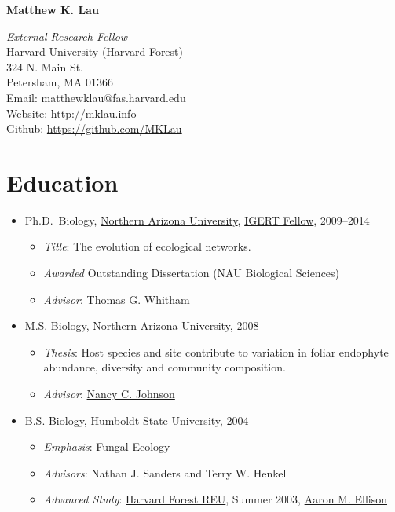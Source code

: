 \documentclass[a4paper]{article}
\author{}
\date{}
\begin{document}
\textbf{\Large Matthew K. Lau} \\

\hline

\begin{multicols}{2}
\textit{External Research Fellow} \\
Harvard University (Harvard Forest) \\
324 N. Main St. \\
Petersham, MA 01366 \\
Email: matthewklau@fas.harvard.edu \\
Website: \url{http://mklau.info} \\
Github: \url{https://github.com/MKLau} \\
\end{multicols}

\section{Education}\label{education}

\begin{itemize}
\item
  Ph.D.~Biology, \href{http://www.nau.edu}{Northern Arizona University},
  \href{http://www.mpcer.nau.edu/igert/}{IGERT Fellow}, 2009--2014

  \begin{itemize}
  \item
    \emph{Title}: The evolution of ecological networks.
  \item
    \emph{Awarded} Outstanding Dissertation (NAU Biological Sciences)
  \item
    \emph{Advisor}:
    \href{http://www6.nau.edu/biology/People/Faculty/Whitham/Whitham.htm}{Thomas
    G. Whitham}
  \end{itemize}
\item
  M.S. Biology, \href{http://www.nau.edu}{Northern Arizona University},
  2008
  \begin{itemize}
  \item
    \emph{Thesis}: Host species and site contribute to variation in
    foliar endophyte abundance, diversity and community composition.
  \item
    \emph{Advisor}:
    \href{http://www.nau.edu/~envsci/johnsonlab/index.htm}{Nancy C.
    Johnson}
  \end{itemize}
\item
  B.S. Biology, \href{http://www.humboldt.edu/~biosci/}{Humboldt State
  University}, 2004

  \begin{itemize}
  \item
    \emph{Emphasis}: Fungal Ecology
  \item
    \emph{Advisors}: Nathan J. Sanders and Terry W. Henkel
  \item
    \emph{Advanced Study}:
    \href{http://harvardforest.fas.harvard.edu/education/reu/reu.html}{Harvard
      Forest REU}, Summer 2003,
    \href{http://harvardforest.fas.harvard.edu/profiles/ellison.html}{Aaron
      M. Ellison}
  \end{itemize}
\end{itemize}
\end{document}
